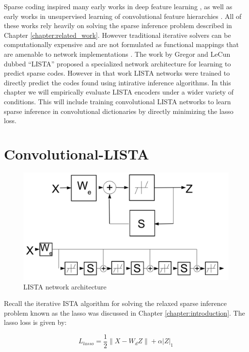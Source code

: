 Sparse coding inspired many early works in deep feature learning
\cite{SC,SAE,SAE2}, as well as early works in unsupervised learning of
convolutional feature hierarchies \cite{ConvSC}. All of these works rely
heavily on solving the sparse inference problem described in Chapter
\ref{chapter:related_work}.  However traditional iterative solvers can be
computationally expensive and are not formulated as functional mappings that
are amenable to network implementations \cite{FISTA}. The work by Gregor and
LeCun dubbed ``LISTA'' \cite{LISTA} proposed a specialized network architecture
for learning to predict sparse codes. However in that work LISTA networks were
trained to directly predict the codes found using intirative inference
algorithms.  In this chapter we will empirically evaluate LISTA encoders under
a wider variety of conditions. This will include training convolutional LISTA
networks to learn sparse inference in convolutional dictionaries by directly
minimizing the lasso loss.

\section{Convolutional-LISTA} 

\begin{figure}
\centering
\includegraphics[scale=0.3]{./figures/LISTA/LISTA.pdf}
\caption{LISTA network architecture} 
\label{fig:LISTA} 
\end{figure}  

Recall the iterative ISTA algorithm for solving the relaxed sparse inference problem
known as the lasso was discussed in Chapter \ref{chapter:introduction}. 
The lasso loss is given by:
  
\begin{equation}
L_{lasso} = \frac{1}{2}\|X-W_dZ\| + \alpha |Z|_1 
\label{eqn:lasso} 
\end{equation} 

